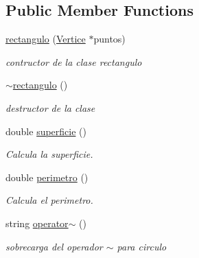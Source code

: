 \subsection*{Public Member Functions}
\begin{DoxyCompactItemize}
\item 
\hyperlink{classrectangulo_aa785cc2d5bd4cbae7dab1912afba62a7}{rectangulo} (\hyperlink{class_vertice}{Vertice} $\ast$puntos)
\begin{DoxyCompactList}\small\item\em contructor de la clase rectangulo \end{DoxyCompactList}\item 
\mbox{\label{classrectangulo_aba192e636fe037aaf0ccc294e4570b29}} 
\hyperlink{classrectangulo_aba192e636fe037aaf0ccc294e4570b29}{$\sim$rectangulo} ()
\begin{DoxyCompactList}\small\item\em destructor de la clase \end{DoxyCompactList}\item 
\mbox{\label{classrectangulo_ab0db7c753485200cf2577532af506426}} 
double \hyperlink{classrectangulo_ab0db7c753485200cf2577532af506426}{superficie} ()
\begin{DoxyCompactList}\small\item\em Calcula la superficie. \end{DoxyCompactList}\item 
\mbox{\label{classrectangulo_a23a8d0d8a593f80776b4629c6dc435e0}} 
double \hyperlink{classrectangulo_a23a8d0d8a593f80776b4629c6dc435e0}{perimetro} ()
\begin{DoxyCompactList}\small\item\em Calcula el perimetro. \end{DoxyCompactList}\item 
\mbox{\label{classrectangulo_a72992eaf78fb4834cbe2774604a70a0d}} 
string \hyperlink{classrectangulo_a72992eaf78fb4834cbe2774604a70a0d}{operator$\sim$} ()
\begin{DoxyCompactList}\small\item\em sobrecarga del operador $\sim$ para circulo \end{DoxyCompactList}\item 
\mbox{\label{classrectangulo_ab0db7c753485200cf2577532af506426}} 

\end{DoxyCompactItemize}
